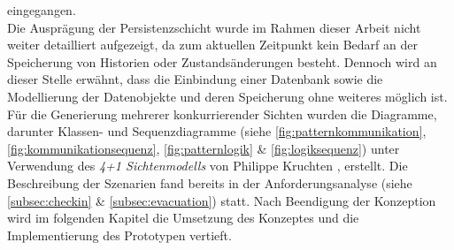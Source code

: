     eingegangen. 
    \\
    Die Ausprägung der Persistenzschicht wurde im Rahmen dieser Arbeit nicht weiter detailliert aufgezeigt, da zum aktuellen Zeitpunkt 
    kein Bedarf an der Speicherung von Historien oder Zustandsänderungen besteht. Dennoch wird an dieser Stelle erwähnt, dass die Einbindung einer 
    Datenbank sowie die Modellierung der Datenobjekte und deren Speicherung ohne weiteres möglich ist. 
\\
\linebreak
Für die Generierung mehrerer konkurrierender Sichten wurden die Diagramme, darunter Klassen- und Sequenzdiagramme 
(siehe \ref{fig:patternkommunikation}, \ref{fig:kommunikationsequenz}, \ref{fig:patternlogik} \& \ref{fig:logiksequenz}) 
unter Verwendung des \textit{4+1 Sichtenmodells} von Philippe Kruchten \cite{Kruchten1995}, erstellt. 
Die Beschreibung der Szenarien fand bereits in der Anforderungsanalyse (siehe \ref{subsec:checkin} \& \ref{subsec:evacuation}) statt. 
Nach Beendigung der Konzeption wird im folgenden Kapitel die Umsetzung des Konzeptes und die 
Implementierung des Prototypen vertieft. 

